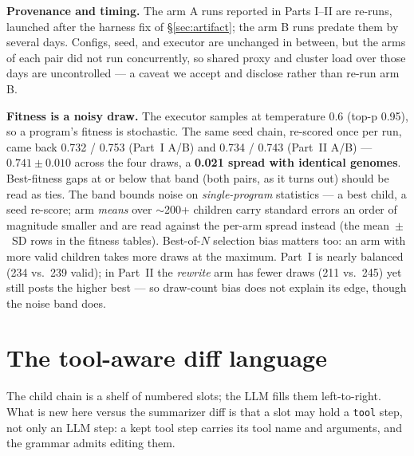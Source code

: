 \documentclass[11pt]{article}
\newcommand{\armA}{\textcolor{bad}{arm A}}
\newcommand{\armB}{\textcolor{accent}{arm B}}
\begin{document}
\medskip\noindent\textbf{Provenance and timing.} The \armA{} runs reported in Parts I--II are
re-runs, launched after the harness fix of \S\ref{sec:artifact}; the \armB{} runs predate them by
several days. Configs, seed, and executor are unchanged in between, but the arms of each pair did
not run concurrently, so shared proxy and cluster load over those days are uncontrolled --- a
caveat we accept and disclose rather than re-run \armB.

\medskip\noindent\textbf{Fitness is a noisy draw.} The executor samples at temperature 0.6
(top-p 0.95), so a program's fitness is stochastic. The same seed chain, re-scored once per run,
came back 0.732 / 0.753 (Part~I A/B) and 0.734 / 0.743 (Part~II A/B) --- $0.741 \pm 0.010$
across the four draws, a \textbf{0.021 spread with identical genomes}. Best-fitness gaps at or below that band
(both pairs, as it turns out) should be read as ties. The band bounds noise on
\emph{single-program} statistics --- a best child, a seed re-score; arm \emph{means} over
$\sim$200+ children carry standard errors an order of magnitude smaller and are read against the
per-arm spread instead (the mean~$\pm$~SD rows in the fitness tables). Best-of-$N$ selection bias matters too:
an arm with more valid children takes more draws at the maximum. Part~I is nearly balanced
(234 vs.\ 239 valid); in Part~II the \emph{rewrite} arm has fewer draws (211 vs.\ 245) yet still
posts the higher best --- so draw-count bias does not explain its edge, though the noise band does.

\section{The tool-aware diff language}
\label{sec:language}
The child chain is a shelf of numbered slots; the LLM fills them left-to-right. What is new
here versus the summarizer diff is that a slot may hold a \texttt{tool} step, not only an LLM
step: a kept tool step carries its tool name and arguments, and the grammar admits editing them.
\end{document}
